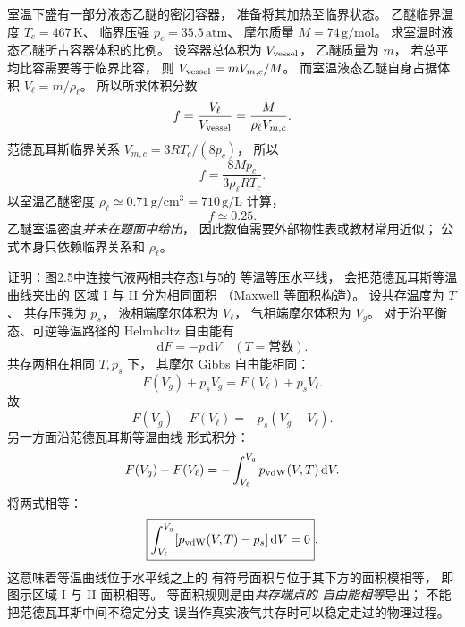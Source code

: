 室温下盛有一部分液态乙醚的密闭容器，
准备将其加热至临界状态。
乙醚临界温度
$T_c=467\,\mathrm K$、
临界压强
$p_c=35.5\,\mathrm{atm}$、
摩尔质量
$M=74\,\mathrm{g/mol}$。
求室温时液态乙醚所占容器体积的比例。
\exsolution
设容器总体积为 $V_{\rm vessel}$，
乙醚质量为 $m$，
若总平均比容需要等于临界比容，
则
$V_{\rm vessel}=mV_{m,c}/M$。
而室温液态乙醚自身占据体积
$V_\ell=m/\rho_\ell$。
所以所求体积分数
\[
f=\frac{V_\ell}{V_{\rm vessel}}
=\frac M{\rho_\ell V_{m,c}}.
\]
范德瓦耳斯临界关系
$V_{m,c}=3RT_c/(8p_c)$，
所以
\[
\boxed{f=\frac{8Mp_c}{3\rho_\ell RT_c}}.
\]
以室温乙醚密度
$\rho_\ell\simeq0.71\,\mathrm{g/cm^3}
=710\,\mathrm{g/L}$ 计算，
\[
\boxed{f\simeq0.25}.
\]
\excheck 乙醚室温密度\emph{并未在题面中给出}，
因此数值需要外部物性表或教材常用近似；
公式本身只依赖临界关系和 $\rho_\ell$。

证明：图2.5中连接气液两相共存态1与5的
等温等压水平线，
会把范德瓦耳斯等温曲线夹出的
区域 I 与 II 分为相同面积
（Maxwell 等面积构造）。
\exsolution
设共存温度为 $T$、
共存压强为 $p_s$，
液相端摩尔体积为 $V_\ell$，
气相端摩尔体积为 $V_g$。
对于沿平衡态、可逆等温路径的
Helmholtz 自由能有
\[
\mathrm dF=-p\,\mathrm dV
\quad(T=\text{常数}).
\]
共存两相在相同 $T,p_s$ 下，
其摩尔 Gibbs 自由能相同：
\[
F(V_g)+p_sV_g=F(V_\ell)+p_sV_\ell.
\]
故
\[
F(V_g)-F(V_\ell)
=-p_s(V_g-V_\ell).
\]
另一方面沿范德瓦耳斯等温曲线
形式积分：
\[
F(V_g)-F(V_\ell)
=-\int_{V_\ell}^{V_g}p_{\rm vdW}(V,T)\,\mathrm dV.
\]
将两式相等：
\[
\boxed{\int_{V_\ell}^{V_g}
[p_{\rm vdW}(V,T)-p_s]\,\mathrm dV=0}.
\]
这意味着等温曲线位于水平线之上的
有符号面积与位于其下方的面积模相等，
即图示区域 I 与 II 面积相等。
\excheck 等面积规则是由\emph{共存端点的
自由能相等}导出；
不能把范德瓦耳斯中间不稳定分支
误当作真实液气共存时可以稳定走过的物理过程。
